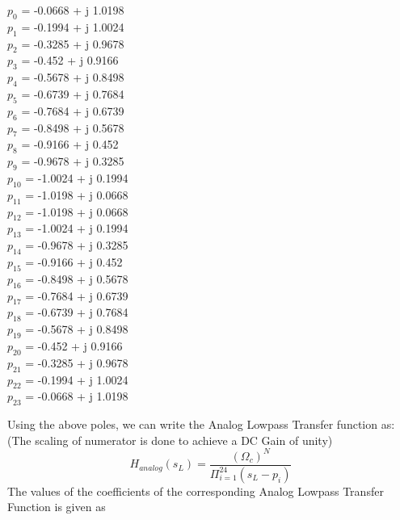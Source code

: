 \documentclass{article}
\begin{document}
\noindent
\vspace{1em}
\begin{center}
$p_{ 0 }$ =  -0.0668  + j 1.0198 \\
$p_{ 1 }$ =  -0.1994  + j 1.0024 \\
$p_{ 2 }$ =  -0.3285  + j 0.9678 \\
$p_{ 3 }$ =  -0.452  + j 0.9166 \\
$p_{ 4 }$ =  -0.5678  + j 0.8498 \\
$p_{ 5 }$ =  -0.6739  + j 0.7684 \\
$p_{ 6 }$ =  -0.7684  + j 0.6739 \\
$p_{ 7 }$ =  -0.8498  + j 0.5678 \\
$p_{ 8 }$ =  -0.9166  + j 0.452 \\
$p_{ 9 }$ =  -0.9678  + j 0.3285 \\
$p_{ 10 }$ =  -1.0024  + j 0.1994 \\
$p_{ 11 }$ =  -1.0198  + j 0.0668 \\
$p_{ 12 }$ =  -1.0198  + j 0.0668 \\
$p_{ 13 }$ =  -1.0024  + j 0.1994 \\
$p_{ 14 }$ =  -0.9678  + j 0.3285 \\
$p_{ 15 }$ =  -0.9166  + j 0.452 \\
$p_{ 16 }$ =  -0.8498  + j 0.5678 \\
$p_{ 17 }$ =  -0.7684  + j 0.6739 \\
$p_{ 18 }$ =  -0.6739  + j 0.7684 \\
$p_{ 19 }$ =  -0.5678  + j 0.8498 \\
$p_{ 20 }$ =  -0.452  + j 0.9166 \\
$p_{ 21 }$ =  -0.3285  + j 0.9678 \\
$p_{ 22 }$ =  -0.1994  + j 1.0024 \\
$p_{ 23 }$ =  -0.0668  + j 1.0198 \\
\end{center}
\noindent
\vspace{1em}
Using the above poles, we can write the Analog Lowpass Transfer function as:
(The scaling of numerator is done to achieve a DC Gain of unity)
\begin{equation*}
    H_{analog}(s_L) = \frac{(\Omega_c)^N}{\Pi_{i=1}^{24} (s_L-p_i)}
\end{equation*}
The values of the coefficients of the corresponding Analog Lowpass Transfer Function  is given as
\end{document}
